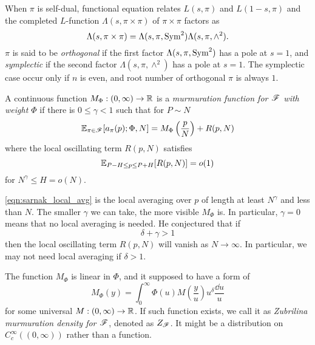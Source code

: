 When $\pi$ is self-dual, functional equation relates $L(s, \pi)$ and $L(1-s, \pi)$ and the completed $L$-function $\Lambda(s, \pi \times \pi)$ of $\pi \times \pi$ factors as
\[
\Lambda(s, \pi \times \pi) = \Lambda(s, \pi, \mathrm{Sym}^2) \Lambda(s, \pi, \wedge^2).
\]
$\pi$ is said to be \emph{orthogonal} if the first factor $\Lambda(s, \pi, \mathrm{Sym}^2)$ has a pole at $s = 1$, and \emph{symplectic} if the second factor $\Lambda(s, \pi, \wedge^2)$ has a pole at $s = 1$.
The symplectic case occur only if $n$ is even, and root number of orthogonal $\pi$ is always $1$.


\begin{definition}
A continuous function $M_\Phi : (0, \infty) \to \mathbb{R}$ is a \emph{murmuration function for $\mathscr{F}$ with weight $\Phi$} if there is $0 \le \gamma < 1$ such that for $P \sim N$
\begin{equation}
    \label{eqn:sarnak_murmuration}
    \mathbb{E}_{\pi \in \mathscr{F}} [a_\pi(p);\Phi, N] = M_\Phi\left(\frac{p}{N}\right) + R(p, N)
\end{equation}
where the local oscillating term $R(p, N)$ satisfies
\begin{equation}
    \label{eqn:sarnak_local_avg}
    \mathbb{E}_{P - H \le p \le P + H} [R(p, N)] = o(1)
\end{equation}
for $N^\gamma \le H = o(N)$.
\end{definition}
\eqref{eqn:sarnak_local_avg} is the local averaging over $p$ of length at least $N^\gamma$ and less than $N$.
The smaller $\gamma$ we can take, the more visible $M_\Phi$ is.
In particular, $\gamma = 0$ means that no local averaging is needed.
He conjectured that if
\begin{equation}
    \label{eqn:sarnak_local_thres}
    \delta + \gamma > 1
\end{equation}
then the local oscillating term $R(p, N)$ will vanish as $N \to \infty$.
In particular, we may not need local averaging if $\delta > 1$.

The function $M_\Phi$ is linear in $\Phi$, and it supposed to have a form of
\begin{equation}
    \label{eqn:sarnak_zubrilina_density}
    M_\Phi(y) = \int_0^{\infty} \Phi(u) M\left(\frac{y}{u}\right) u^\delta \frac{\dd u}{u}
\end{equation}
for some universal $M : (0, \infty) \to \mathbb{R}$.
If such function exists, we call it as \emph{Zubrilina murmuration density for $\mathscr{F}$}, denoted as $Z_{\mathscr{F}}$.
It might be a distribution on $C_c^\infty((0, \infty))$ rather than a function.



